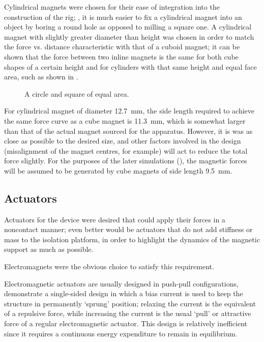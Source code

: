 Cylindrical magnets were chosen for their ease of integration
into the construction of the rig; \eg, it is much easier to fix
a cylindrical magnet into an object by boring a round hole as
opposed to milling a square one. A cylindrical magnet with slightly
greater diameter than height was chosen in order to match the
force vs. distance characteristic with that of a cuboid magnet;
it can be shown that the force between two inline magnets is the
same for both cube shapes of a certain height and for cylinders
with that same height and equal face area, such as shown in .

\begin{figure}
  \caption{A circle and square of equal area.}
\end{figure}

For cylindrical magnet of diameter \SI{12.7}{mm}, the side length required to
achieve the same force curve as a cube magnet is \SI{11.3}{mm}, which is
somewhat larger than that of the actual magnet sourced for the apparatus.
However, it is was as close as possible to the desired size, and other factors
involved in the design (misalignment of the magnet centres, for example) will
act to reduce the total force slightly. For the purposes of the later
simulations (), the magnetic forces will be assumed to be
generated by cube magnets of side length \SI{9.5}{mm}.

\subsection{Actuators}

Actuators for the device were desired that could apply their forces in a
noncontact manner; even better would be actuators that do not add stiffness or
mass to the isolation platform, in order to highlight the dynamics of the
magnetic support as much as possible.

Electromagnets were the obvious choice to satisfy this requirement.

Electromagnetic actuators are usually designed in push-pull configurations,
\textcite{nandi2009} demonstrate a single-sided design in which a bias current
is used to keep the structure in permanently `sprung' position; relaxing the
current is the equivalent of a repulsive force, while increasing the current
is the usual `pull' or attractive force of a regular electromagnetic actuator.
This design is relatively inefficient since it requires a continuous energy
expenditure to remain in equilibrium.

